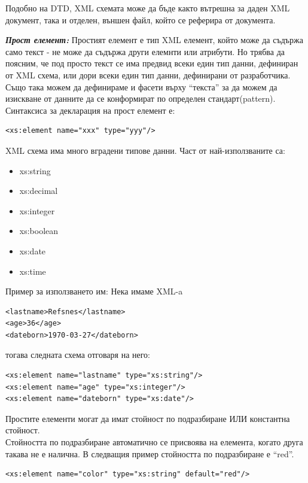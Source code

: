 \documentclass[11pt]{article} %
\begin{document}
Подобно на DTD, XML схемата може да бъде както вътрешна за даден XML документ, така и отделен, външен файл, който се реферира от документа.\\\par

\textit{\textbf{Прост елемент: }} Простият елемент е тип XML елемент, който може да съдържа само текст - не може да съдържа други елемнти или атрибути. Но трябва да поясним, че под просто текст се има предвид всеки един тип данни, дефиниран от XML схема, или дори всеки един тип данни, дефинирани от разработчика. Също така можем да дефинираме и фасети върху \enquote{текста} за да можем да изискване от данните да се конформират по определен стандарт(pattern). Синтаксиса за декларация на прост елемент е:\\
\begin{verbatim}
<xs:element name="xxx" type="yyy"/>
\end{verbatim}
XML схема има много вградени типове данни. Част от най-използваните са:
\begin{itemize}[noitemsep]
	\item xs:string
	\item xs:decimal
	\item xs:integer
	\item xs:boolean
	\item xs:date
	\item xs:time
\end{itemize}

Пример за използването им: Нека имаме XML-a\\
\begin{verbatim}
<lastname>Refsnes</lastname>
<age>36</age>
<dateborn>1970-03-27</dateborn>
\end{verbatim}

тогава следната схема отговаря на него:
\begin{verbatim}
<xs:element name="lastname" type="xs:string"/>
<xs:element name="age" type="xs:integer"/>
<xs:element name="dateborn" type="xs:date"/>
\end{verbatim}

Простите елементи могат да имат стойност по подразбиране ИЛИ константна стойност.\\
Стойността по подразбиране автоматично се присвоява на елемента, когато друга такава не е налична. В следващия пример стойността по подразбиране е \enquote{red}.
\begin{verbatim}
<xs:element name="color" type="xs:string" default="red"/>
\end{verbatim}
\end{document}

